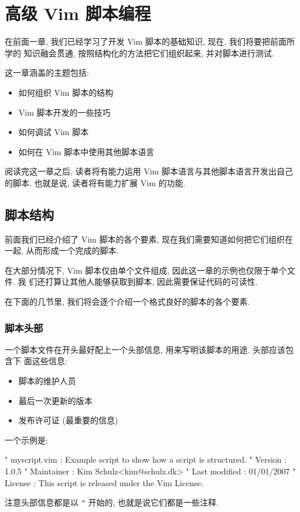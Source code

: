 \chapter{高级 Vim 脚本编程}
\label{chap:extended_vim_scripting}

在前面一章, 我们已经学习了开发 Vim 脚本的基础知识, 现在, 我们将要把前面所学的
知识融会贯通, 按照结构化的方法把它们组织起来, 并对脚本进行测试.

这一章涵盖的主题包括:
\begin{itemize}
    \item 如何组织 Vim 脚本的结构
    \item Vim 脚本开发的一些技巧
    \item 如何调试 Vim 脚本
    \item 如何在 Vim 脚本中使用其他脚本语言
\end{itemize}

阅读完这一章之后, 读者将有能力运用 Vim 脚本语言与其他脚本语言开发出自己的脚本.
也就是说, 读者将有能力扩展 Vim 的功能.

\section{脚本结构}
\label{sec:script_structure}

前面我们已经介绍了 Vim 脚本的各个要素, 现在我们需要知道如何把它们组织在一起,
从而形成一个完成的脚本.

在大部分情况下, Vim 脚本仅由单个文件组成, 因此这一章的示例也仅限于单个文件. 我
们还打算让其他人能够获取到脚本, 因此需要保证代码的可读性.

在下面的几节里, 我们将会逐个介绍一个格式良好的脚本的各个要素.

\subsection{脚本头部}
\label{subsec:script_header}

一个脚本文件在开头最好配上一个头部信息, 用来写明该脚本的用途. 头部应该包含下
面这些信息:
\begin{itemize}
    \item 脚本的维护人员
    \item 最后一次更新的版本
    \item 发布许可证 (最重要的信息)
\end{itemize}
一个示例是:
\begin{vimcode}
" myscript.vim  : Example script to show how a script is structured.
" Version       : 1.0.5
" Maintainer    : Kim Schulz<kim@schulz.dk>
" Last modified : 01/01/2007
" License       : This script is released under the Vim License.
\end{vimcode}
注意头部信息都是以 \texttt{"} 开始的, 也就是说它们都是一些注释.

